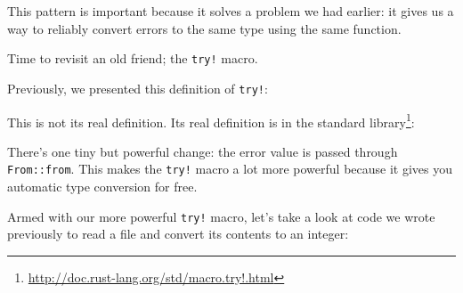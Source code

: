\documentclass[a4paper,]{book}
\newenvironment{Shaded}{\begin{snugshade}}{\end{snugshade}}
\newcommand{\KeywordTok}[1]{\textcolor[rgb]{0.13,0.29,0.53}{\textbf{{#1}}}}
\newcommand{\ConstantTok}[1]{\textcolor[rgb]{0.00,0.00,0.00}{{#1}}}
\newcommand{\PreprocessorTok}[1]{\textcolor[rgb]{0.56,0.35,0.01}{\textit{{#1}}}}
\newcommand{\NormalTok}[1]{{#1}}
\renewcommand{\href}[2]{#2\footnote{\url{#1}}}
\begin{document}
This pattern is important because it solves a problem we had earlier: it
gives us a way to reliably convert errors to the same type using the
same function.

Time to revisit an old friend; the \texttt{try!} macro.


Previously, we presented this definition of \texttt{try!}:

\begin{Shaded}
\end{Shaded}

This is not its real definition. Its real definition is
\href{http://doc.rust-lang.org/std/macro.try!.html}{in the standard
library}:


\begin{Shaded}
\end{Shaded}

There's one tiny but powerful change: the error value is passed through
\texttt{From::from}. This makes the \texttt{try!} macro a lot more
powerful because it gives you automatic type conversion for free.

Armed with our more powerful \texttt{try!} macro, let's take a look at
code we wrote previously to read a file and convert its contents to an
integer:
\end{document}
